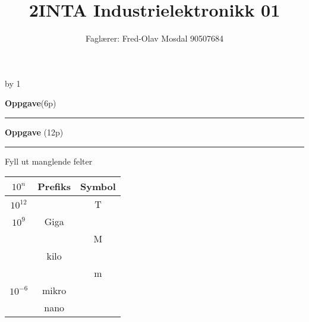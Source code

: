 \documentclass[12pt,a4paper]{article}
\def\oppgave{
            \advance\questnum by 1
	    \ifthenelse{\questnum>0\AND \questnum<9}
	    {
                \vskip 1cm
		\textbf{Oppgave}\hskip 5pt\the\questnum \hfill \hfill(6p)
		\vskip 3pt
		\hrule
	\vskip 0.5cm}
	{
                \vskip 1cm
		\textbf{Oppgave}\hskip 5pt \the\questnum \hfill \hfill(12p)
		\vskip 3pt \hrule \vskip 0.5cm }

		}
\begin{document}
\title{2INTA Industrielektronikk 01}
\author{Faglærer: Fred-Olav Mosdal 90507684\\}
\maketitle
\oppgave{}%
\vskip 2.5pt 
Fyll ut manglende felter\\
	\huge
\begin{center}
\begin{tabular}{|c|c|c|}
\hline 
$10^{n}$ & Prefiks  & Symbol\tabularnewline
\hline 
\hline 
$10^{12}$ &  & T \tabularnewline
\hline 
$10^{9}$ & Giga  & \tabularnewline
\hline 
& & M \tabularnewline
\hline 
 & kilo  & \tabularnewline
\hline 
 &   & m\tabularnewline
\hline 
$10^{-6}$ & mikro  & \tabularnewline
\hline 
& nano  & \tabularnewline
\hline 
\end{tabular} 
\end{center}
\normalsize
\end{document}
